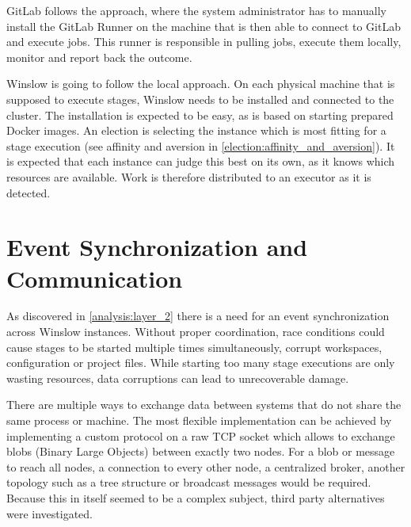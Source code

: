 GitLab\cite{gitlab:main} follows the approach, where the system administrator has to manually install the GitLab Runner on the machine that is then able to connect to GitLab and execute jobs.
This runner is responsible in pulling jobs, execute them locally, monitor and report back the outcome.

Winslow is going to follow the local approach.
On each physical machine that is supposed to execute stages, Winslow needs to be installed and connected to the cluster.
The installation is expected to be easy, as is based on starting prepared Docker images.
An election is selecting the instance which is most fitting for a stage execution (see affinity and aversion in \autoref{election:affinity_and_aversion}).
It is expected that each instance can judge this best on its own, as it knows which resources are available.
Work is therefore distributed to an executor as it is detected.



\section{Event Synchronization and Communication}

As discovered in \autoref{analysis:layer_2} there is a need for an event synchronization across Winslow instances.
Without proper coordination, race conditions could cause stages to be started multiple times simultaneously, corrupt workspaces, configuration or project files.
While starting too many stage executions are only wasting resources, data corruptions can lead to unrecoverable damage.

There are multiple ways to exchange data between systems that do not share the same process or machine.
The most flexible implementation can be achieved by implementing a custom protocol on a raw TCP socket which allows to exchange blobs (Binary Large Objects) between exactly two nodes.
For a blob or message to reach all nodes, a connection to every other node, a centralized broker, another topology such as a tree structure or broadcast messages would be required.
Because this in itself seemed to be a complex subject, third party alternatives were investigated.

